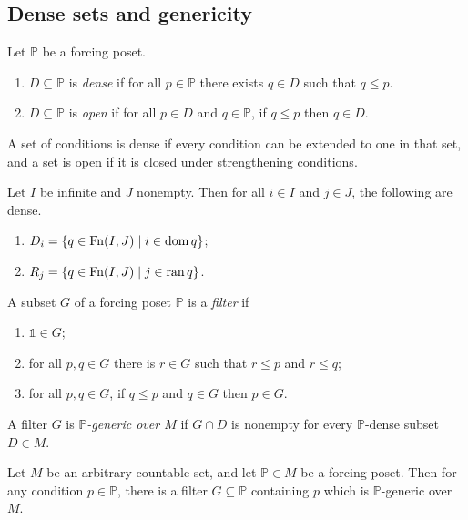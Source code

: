 \subsection{Dense sets and genericity}
\begin{definition}
    Let \( \mathbb P \) be a forcing poset.
    \begin{enumerate}
        \item \( D \subseteq \mathbb P \) is \emph{dense} if for all \( p \in \mathbb P \) there exists \( q \in D \) such that \( q \leq p \).
        \item \( D \subseteq \mathbb P \) is \emph{open} if for all \( p \in D \) and \( q \in \mathbb P \), if \( q \leq p \) then \( q \in D \).
    \end{enumerate}
\end{definition}
A set of conditions is dense if every condition can be extended to one in that set, and a set is open if it is closed under strengthening conditions.
\begin{example}
    Let \( I \) be infinite and \( J \) nonempty.
    Then for all \( i \in I \) and \( j \in J \), the following are dense.
    \begin{enumerate}
        \item \( D_i = \qty{q \in \operatorname{Fn}(I, J) \mid i \in \operatorname{dom}q} \);
        \item \( R_j = \qty{q \in \operatorname{Fn}(I, J) \mid j \in \operatorname{ran}q} \).
    \end{enumerate}
\end{example}
\begin{definition}
    A subset \( G \) of a forcing poset \( \mathbb P \) is a \emph{filter} if
    \begin{enumerate}
        \item \( \Bbbone \in G \);
        \item for all \( p, q \in G \) there is \( r \in G \) such that \( r \leq p \) and \( r \leq q \);
        \item for all \( p, q \in G \), if \( q \leq p \) and \( q \in G \) then \( p \in G \).
    \end{enumerate}
    A filter \( G \) is \emph{\( \mathbb P \)-generic over \( M \)} if \( G \cap D \) is nonempty for every \( \mathbb P \)-dense subset \( D \in M \).
\end{definition}
\begin{lemma}
    Let \( M \) be an arbitrary countable set, and let \( \mathbb P \in M \) be a forcing poset.
    Then for any condition \( p \in \mathbb P \), there is a filter \( G \subseteq \mathbb P \) containing \( p \) which is \( \mathbb P \)-generic over \( M \).
\end{lemma}
